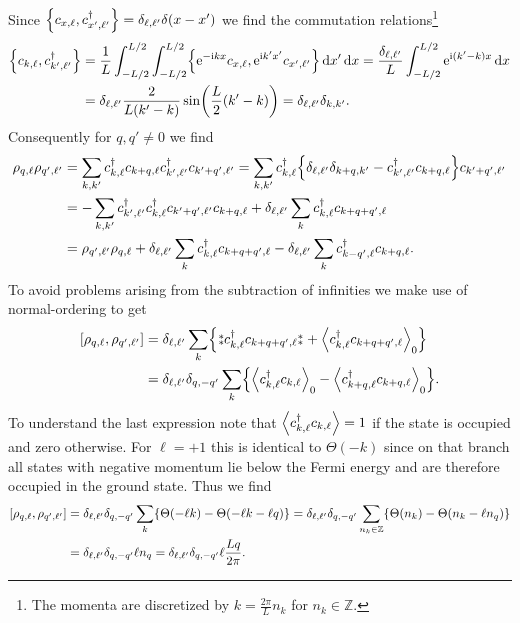 \documentclass[english, parskip=full]{scrartcl}
\begin{document}
Since $\klc*{c_{x,\ell}, c_{x',\ell'}^\dagger} = \delta_{\ell,\ell'} \delta(x-x')$ we find the commutation relations\footnote{The momenta are discretized by $k=\frac{2\pi}{L}n_k$ for $n_k\in\mathbb{Z}$.}
\begin{align}
\klc*{c_{k,\ell}, c_{k',\ell'}^\dagger} &= \frac{1}{L} \intx{-L/2}{L/2}{\intx{-L/2}{L/2}{\klc*{\powe{-\i kx} c_{x,\ell}, \powe{\i k'x'} c_{x',\ell'}}}{x'} }{x} = \frac{\delta_{\ell,\ell'}}{L} \intx{-L/2}{L/2}{\powe{\i (k'-k)x}}{x} \\
&= \delta_{\ell,\ell'} \frac{2}{L(k'-k)} \sin\kla*{\frac{L}{2}(k'-k)} = \delta_{\ell,\ell'} \delta_{k,k'}.
\end{align}
Consequently for $q,q'\neq 0$ we find
\begin{align}
\rho_{q,\ell} \rho_{q',\ell'} &= \sum_{k,k'}c_{k,\ell}^\dagger c_{k+q,\ell} c_{k',\ell'}^\dagger c_{k'+q',\ell'} = \sum_{k,k'}c_{k,\ell}^\dagger \klc*{\delta_{\ell,\ell'} \delta_{k+q,k'} - c_{k',\ell'}^\dagger c_{k+q,\ell} } c_{k'+q',\ell'}\\
&= -\sum_{k,k'} c_{k',\ell'}^\dagger c_{k,\ell}^\dagger c_{k'+q',\ell'} c_{k+q,\ell} + \delta_{\ell,\ell'} \sum_k c_{k,\ell}^\dagger c_{k+q+q',\ell}\\
&= \rho_{q',\ell'}\rho_{q,\ell} + \delta_{\ell,\ell'} \sum_k c_{k,\ell}^\dagger c_{k+q+q',\ell} - \delta_{\ell,\ell'} \sum_k c_{k-q',\ell}^\dagger c_{k+q,\ell}.
\end{align}
To avoid problems arising from the subtraction of infinities we make use of normal-ordering to get
\begin{align}
\klb*{\rho_{q,\ell},\rho_{q',\ell'}} &= \delta_{\ell,\ell'} \sum_k \klc*{ \varnormord{c_{k,\ell}^\dagger c_{k+q+q',\ell}} + \bra*{c_{k,\ell}^\dagger c_{k+q+q',\ell}}_0} \\
&= \delta_{\ell,\ell'} \delta_{q,-q'} \sum_k \klc*{\bra*{c_{k,\ell}^\dagger c_{k,\ell}}_0 - \bra*{c_{k+q,\ell}^\dagger c_{k+q,\ell}}_0 }.
\end{align}
To understand the last expression note that $\bra*{c_{k,\ell}^\dagger c_{k,\ell}} = 1$ if the state is occupied and zero otherwise.
For $\ell=+1$ this is identical to $\Theta(-k)$ since on that branch all states with negative momentum lie below the Fermi energy and are therefore occupied in the ground state.
Thus we find
\begin{align}
\klb*{\rho_{q,\ell},\rho_{q',\ell'}} &= \delta_{\ell,\ell'} \delta_{q,-q'} \sum_k \klc*{\Theta(-\ell k) - \Theta(-\ell k - \ell q)} = \delta_{\ell,\ell'} \delta_{q,-q'} \sum_{n_k\in\mathbb{Z}} \klc*{\Theta(n_k) - \Theta(n_k - \ell n_q)}\\
&= \delta_{\ell,\ell'} \delta_{q,-q'} \ell n_q = \delta_{\ell,\ell'} \delta_{q,-q'} \ell \frac{Lq}{2\pi}.
\end{align}
\end{document}
